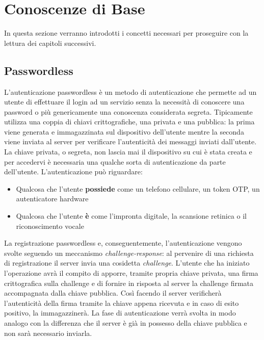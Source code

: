 \chapter{Conoscenze di Base}
\label{conoscenze}

In questa sezione verranno introdotti i concetti necessari per proseguire con la lettura dei capitoli successivi. 

\section{Passwordless}
\label{passwordless}

L'autenticazione passwordless è un metodo di autenticazione che permette ad un utente di effettuare il login ad un servizio senza la necessità di conoscere una password o più genericamente una conoscenza considerata segreta. Tipicamente utilizza una coppia di chiavi crittografiche, una privata e una pubblica: la prima viene generata e immagazzinata sul dispositivo dell'utente mentre la seconda viene inviata al server per verificare l'autenticità dei messaggi inviati dall'utente. La chiave privata, o segreta, non lascia mai il dispositivo su cui è stata creata e per accedervi è necessaria una qualche sorta di autenticazione da parte dell'utente. L'autenticazione può riguardare:

\begin{itemize}
	\item Qualcosa che l'utente \textbf{possiede} come un telefono cellulare, un token OTP, un autenticatore hardware
	\item Qualcosa che l'utente \textbf{è} come l'impronta digitale, la scansione retinica o il riconoscimento vocale \cite{wiki:passwordless}
\end{itemize}

La registrazione passwordless e, conseguentemente, l'autenticazione vengono svolte seguendo un meccanismo \emph{challenge-response}: al pervenire di una richiesta di registrazione il server invia una cosidetta \emph{challenge}. L'utente che ha iniziato l'operazione avrà il compito di apporre, tramite propria chiave privata, una firma crittografica sulla challenge e di fornire in risposta al server la challenge firmata accompagnata dalla chiave pubblica. Così facendo il server verificherà l'autenticità della firma tramite la chiave appena ricevuta e in caso di esito positivo, la immagazzinerà. La fase di autenticazione verrà svolta in modo analogo con la differenza che il server è già in possesso della chiave pubblica e non sarà necessario inviarla.

